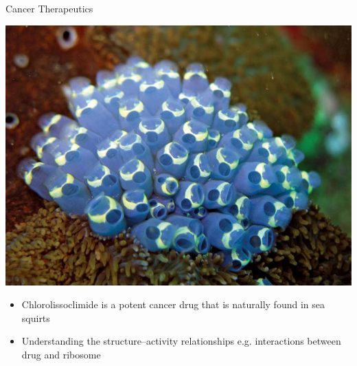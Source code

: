\documentclass[11pt]{beamer}
\begin{document}
\begin{frame}{Cancer Therapeutics}
  \begin{center}
    \includegraphics[scale=0.17]{sea_squirt.jpg}
  \end{center}

  \begin{itemize}
  \item Chlorolissoclimide is a potent cancer drug that
    is naturally found in sea squirts
  \item Understanding the structure--activity relationships
    e.g. interactions between drug and ribosome
  \end{itemize}
\end{frame}
\end{document}
